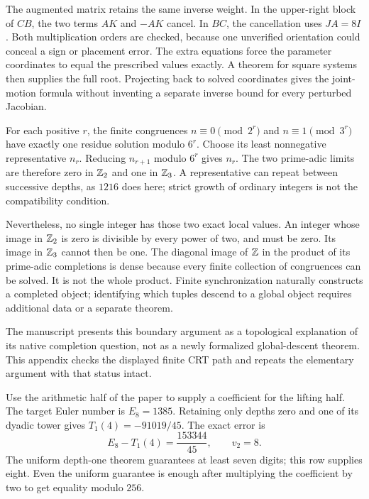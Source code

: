 The augmented matrix retains the same inverse weight. In the upper-right block of $CB$, the two terms $AK$ and $-AK$ cancel. In $BC$, the cancellation uses $JA=8I$. Both multiplication orders are checked, because one unverified orientation could conceal a sign or placement error.
The extra equations force the parameter coordinates to equal the prescribed values exactly. A theorem for square systems then supplies the full root. Projecting back to solved coordinates gives the joint-motion formula without inventing a separate inverse bound for every perturbed Jacobian.

For each positive $r$, the finite congruences $n\equiv0\pmod{2^r}$ and $n\equiv1\pmod{3^r}$ have exactly one residue solution modulo $6^r$. Choose its least nonnegative representative $n_r$.
Reducing $n_{r+1}$ modulo $6^r$ gives $n_r$. The two prime-adic limits are therefore zero in $\mathbb Z_2$ and one in $\mathbb Z_3$. A representative can repeat between successive depths, as $1216$ does here; strict growth of ordinary integers is not the compatibility condition.

Nevertheless, no single integer has those two exact local values. An integer whose image in $\mathbb Z_2$ is zero is divisible by every power of two, and must be zero. Its image in $\mathbb Z_3$ cannot then be one.
The diagonal image of $\mathbb Z$ in the product of its prime-adic completions is dense because every finite collection of congruences can be solved. It is not the whole product. Finite synchronization naturally constructs a completed object; identifying which tuples descend to a global object requires additional data or a separate theorem.

The manuscript presents this boundary argument as a topological explanation of its native completion question, not as a newly formalized global-descent theorem. This appendix checks the displayed finite CRT path and repeats the elementary argument with that status intact.

Use the arithmetic half of the paper to supply a coefficient for the lifting half. The target Euler number is $E_8=1385$. Retaining only depths zero and one of its dyadic tower gives $T_1(4)=-91019/45$.
The exact error is
\[
 E_8-T_1(4)=\frac{153344}{45},\qquad v_2=8.
\]
The uniform depth-one theorem guarantees at least seven digits; this row supplies eight. Even the uniform guarantee is enough after multiplying the coefficient by two to get equality modulo $256$.

